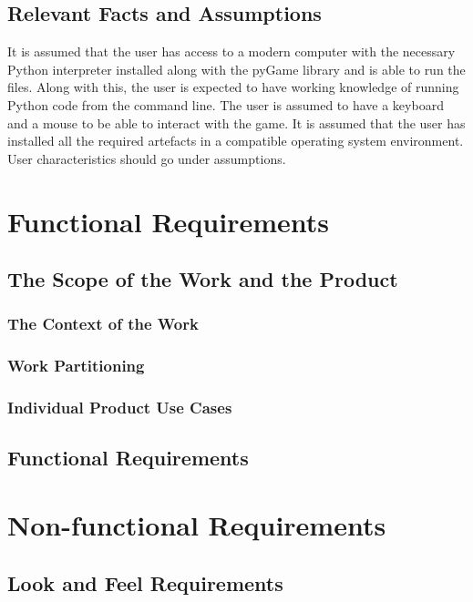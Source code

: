 \documentclass[12pt, titlepage]{article}
\begin{document}
\subsection{Relevant Facts and Assumptions}
    It is assumed that the user has access to a modern computer with the necessary Python interpreter installed along with the pyGame library and is able to run the files. Along with this, the user is expected to have working knowledge of running Python code from the command line. The user is assumed to have a keyboard and a mouse to be able to interact with the game. It is assumed that the user has installed all the required artefacts in a compatible operating system environment.
User characteristics should go under assumptions.

\section{Functional Requirements}

\subsection{The Scope of the Work and the Product}

\subsubsection{The Context of the Work}

\subsubsection{Work Partitioning}

\subsubsection{Individual Product Use Cases}

\subsection{Functional Requirements}

\section{Non-functional Requirements}

\subsection{Look and Feel Requirements}
\end{document}
